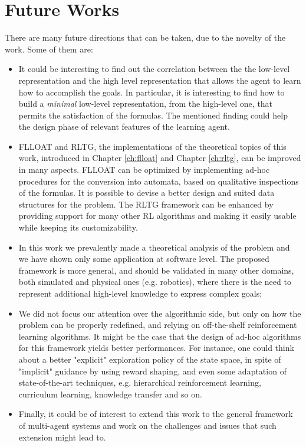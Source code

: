 \section{Future Works}
There are many future directions that can be taken, due to the novelty of the work. Some of them are:
\begin{itemize}
	\item It could be interesting to find out the correlation between the the low-level representation and the high level representation that allows the agent to learn how to accomplish the goals. In particular, it is interesting to find how to build a \emph{minimal} low-level representation, from the high-level one, that permits the satisfaction of the \LLf formulas. The mentioned finding could help the design phase of relevant features of the learning agent.
	
	\item FLLOAT and RLTG, the implementations of the theoretical topics of this work, introduced in Chapter \ref{ch:flloat} and Chapter \ref{ch:rltg}, can be improved in many aspects. FLLOAT can be optimized by implementing ad-hoc procedures for the conversion into automata, based on qualitative inspections of the formulas. It is possible to devise a better design and suited data structures for the problem. The RLTG framework can be enhanced by providing support for many other RL algorithms and making it easily usable while keeping its customizability.
	
	\item In this work we prevalently made a theoretical analysis of the problem and we have shown only some application at software level. The proposed framework is more general, and should be validated in many other domains, both simulated and physical ones (e.g. robotics), where there is the need to represent additional high-level knowledge to express complex goals;
	\item We did not focus our attention over the algorithmic side, but only on how the problem can be properly redefined, and relying on off-the-shelf reinforcement learning algorithms. It might be the case that the design of ad-hoc algorithms for this framework yields better performances. For instance, one could think about a better "explicit" exploration policy of the state space, in spite of "implicit" guidance by using reward shaping, and even some adaptation of state-of-the-art techniques, e.g. hierarchical reinforcement learning, curriculum learning, knowledge transfer and so on.
	\item Finally, it could be of interest to extend this work to the general framework of multi-agent systems and work on the challenges and issues that such extension might lead to.
\end{itemize}

